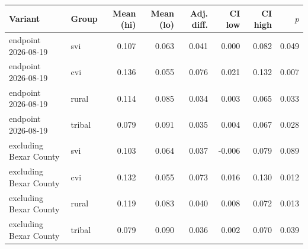 \begin{tabular}{llrrrrrr}
\toprule
Variant & Group & Mean (hi) & Mean (lo) & Adj. diff. & CI low & CI high & $p$ \\
\midrule
endpoint 2026-08-19 & svi & 0.107 & 0.063 & 0.041 & 0.000 & 0.082 & 0.049 \\
endpoint 2026-08-19 & cvi & 0.136 & 0.055 & 0.076 & 0.021 & 0.132 & 0.007 \\
endpoint 2026-08-19 & rural & 0.114 & 0.085 & 0.034 & 0.003 & 0.065 & 0.033 \\
endpoint 2026-08-19 & tribal & 0.079 & 0.091 & 0.035 & 0.004 & 0.067 & 0.028 \\
excluding Bexar County & svi & 0.103 & 0.064 & 0.037 & -0.006 & 0.079 & 0.089 \\
excluding Bexar County & cvi & 0.132 & 0.055 & 0.073 & 0.016 & 0.130 & 0.012 \\
excluding Bexar County & rural & 0.119 & 0.083 & 0.040 & 0.008 & 0.072 & 0.013 \\
excluding Bexar County & tribal & 0.079 & 0.090 & 0.036 & 0.002 & 0.070 & 0.039 \\
\bottomrule
\end{tabular}